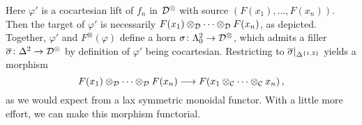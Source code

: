 \begin{numpar}
\begin{center}
	\end{center}
	Here $\varphi'$ is a cocartesian lift of $f_n$ in $\mathcal{D}^\otimes$ with source $(F(x_1),\dotsc,F(x_n))$. Then the target of $\varphi'$ is necessarily $F(x_1)\otimes_{\mathcal{D}}\dotsb\otimes_{\mathcal{D}} F(x_n)$, as depicted. Together, $\varphi'$ and $F^\otimes(\varphi)$ define a horn $\sigma\colon\Lambda_0^2\rightarrow \mathcal{D}^\otimes$, which admits a filler $\ov\sigma\colon \Delta^2\rightarrow \Dd^\otimes$ by definition of $\varphi'$ being cocartesian. Restricting to $\ov\sigma|_{\Delta^{\{1,2\}}}$ yields a morphism
	\begin{equation*}
		F(x_1)\otimes_{\mathcal{D}}\dotsb \otimes_{\mathcal{D}} F(x_n)\longrightarrow F(x_1\otimes_{\mathcal{C}}\dotsb\otimes_{\mathcal{C}} x_n)\,,
	\end{equation*}
	as we would expect from a lax symmetric monoidal functor. With a little more effort, we can make this morphism functorial.
\end{numpar}
